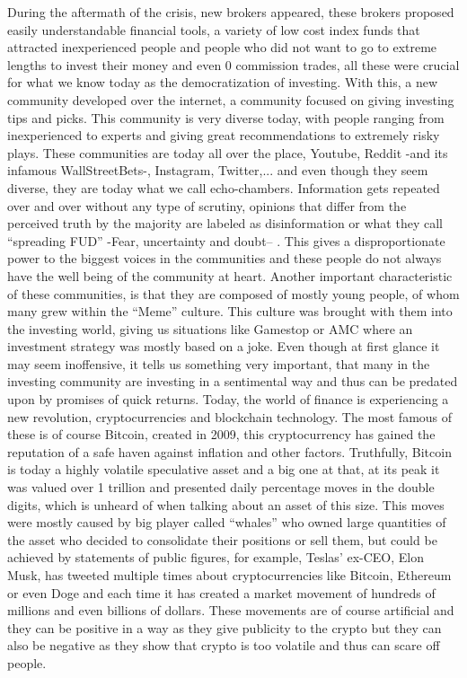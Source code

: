 \documentclass[conference]{IEEEtran}
\begin{document}
During the aftermath of the crisis, new brokers appeared, these brokers proposed easily understandable financial tools, a variety of low cost index funds that attracted inexperienced people and people who did not want to go to extreme lengths to invest their money and even 0 commission trades, all these were crucial for what we know today as the democratization of investing. With this, a new community developed over the internet, a community focused on giving investing tips and picks. This community is very diverse today, with people ranging from inexperienced  to experts and giving great recommendations to extremely risky plays. 
\newline
\newline
These communities are today all over the place, Youtube, Reddit -and its infamous WallStreetBets-, Instagram, Twitter,... and even though they seem diverse, they are today what we call echo-chambers. Information gets repeated over and over without any type of scrutiny, opinions that differ from the perceived truth by the majority are labeled as disinformation or what they call “spreading FUD” -Fear, uncertainty and doubt– . This gives a disproportionate power to the biggest voices in the communities and these people do not always have the well being of the community at heart.
Another important characteristic of these communities, is that they are composed of mostly young people, of whom many grew within the “Meme” culture. This culture was brought with them into the investing world, giving us situations like Gamestop or AMC where an investment strategy was mostly based on a joke. Even though at first glance it may seem inoffensive, it tells us something very important, that many in the investing community are investing in a sentimental way and thus can be predated upon by promises of quick returns. 
\newline
\newline
Today, the world of finance is experiencing a new revolution, cryptocurrencies and blockchain technology. The most famous of these is of course Bitcoin, created in 2009, this cryptocurrency has gained the reputation of a safe haven against inflation and other factors. Truthfully, Bitcoin is today a highly volatile speculative asset and a big one at that, at its peak it was valued over 1 trillion and presented daily percentage moves in the double digits, which is unheard of when talking about an asset of this size. This moves were mostly caused by big player called “whales” who owned large quantities of the asset who decided to consolidate their positions or sell them, but could be achieved by statements of public figures, for example, Teslas’ ex-CEO, Elon Musk, has tweeted multiple times about cryptocurrencies like Bitcoin, Ethereum or even Doge and each time it has created a market movement of hundreds of millions and even billions of dollars. These movements are of course artificial and they can be positive in a way as they give publicity to the crypto but they can also be negative as they show that crypto is too volatile and thus can scare off people.
\newline
\end{document}
